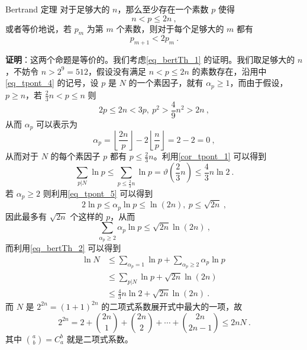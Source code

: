 

\begin{theorem}{Bertrand 定理}
对于足够大的 $n$，那么至少存在一个素数 $p$ 使得
\begin{equation}\label{eq_bertTh_1}
n < p \le 2n ~,
\end{equation}
或者等价地说，若 $p_m$ 为第 $m$ 个素数，则对于每个足够大的 $m$ 都有
\begin{equation}
p_{m+1} < 2 p_m ~.
\end{equation}

\end{theorem}

\textbf{证明}：这两个命题是等价的。我们考虑\autoref{eq_bertTh_1} 的证明。我们取足够大的 $n$，不妨令 $n > 2^9 = 512$，假设没有满足 $n < p \le 2n$ 的素数存在，沿用中\autoref{eq_tpont_4} 的记号，设 $p$ 是 $N$ 的一个素因子，就有 $\alpha_p \ge 1$，而由于假设，$p \ge n$，若 $\frac 23 n < p \le n$ 则
\begin{equation}
2p \le 2n < 3p, ~ p^2  > \frac 49 n^2 > 2n~,
\end{equation}
从而 $\alpha_p$ 可以表示为
\begin{equation}
\alpha_p = \left\lfloor \frac{2n}p \right\rfloor - 2 \left \lfloor \frac np \right \rfloor = 2 - 2 = 0 ~,
\end{equation}
从而对于 $N$ 的每个素因子 $p$ 都有 $p \le \frac23 n$。利用\autoref{cor_tpont_1} 可以得到
\begin{equation}\label{eq_bertTh_2}
\sum_{p | N} \ln p \le \sum_{p\le \frac 23 n} \ln p = \vartheta(\frac 23 n) \le \frac 43 n \ln 2 ~.
\end{equation}
若 $\alpha_p \ge 2$ 则利用\autoref{eq_tpont_5} 可以得到
\begin{equation}
2 \ln p \le \alpha_p \ln p \le \ln (2n), ~ p \le \sqrt{2n } ~,
\end{equation}
因此最多有 $\sqrt{2n}$ 个这样的 $p$，从而
\begin{equation}
\sum_{\alpha_p \ge 2} \alpha_p \ln p \le \sqrt{2n} \ln(2n) ~,
\end{equation}
而利用\autoref{eq_bertTh_2} 可以得到
\begin{equation}\label{eq_bertTh_3}
\begin{aligned}
\ln N &\le \sum_{\alpha_p = 1} \ln p + \sum_{\alpha_p \ge 2} \alpha_p \ln p ~\\
& \le \sum_{p | N} \ln p + \sqrt{2n} \ln(2n) ~\\
& \le \frac43 n \ln 2 + \sqrt{2n} \ln(2n) ~.
\end{aligned}
\end{equation}
而 $N$ 是 $2^{2n} = (1+1)^{2n}$ 的二项式系数展开式中最大的一项，故
\begin{equation}\label{eq_bertTh_4}
2^{2n} = 2 + \binom{2n}{1} + \binom{2n}{2} + \cdots + \binom{2n}{2n-1} \le 2nN ~.
\end{equation}
其中 $\binom{a}{b}  = C^b_a$ 就是二项式系数。

